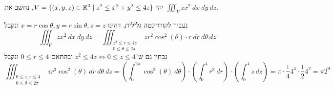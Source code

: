 \Question{}
יהי $V = \{ (x, y, z) \in \mathbb{R}^3 \mid z^2 \le x^2 + y^2 \le 4z \}$, נחשב את $\iiint_V zx^2\ dx\ dy\ dz$.

נעביר לקורדינטה גלילית, דהינו $x = r \cos \theta, y = r \sin \theta, z = z$ ונקבל
\[
	\iiint_V z x^2\ dx\ dy\ dz
	= \iiint_{\substack{z^2 \le r \le 4z \\ 0 \le \theta \le 2\pi}} z r^2 \cos^2(\theta) \cdot r\ dr\ d\theta\ dz
\]
נבחין גם ש־$z^2 \le 4z \iff 0 \le z \le 4$ ובהתאם $0 \le r \le 4$ ונקבל
\[
	\iiint_{\substack{0 \le z, r \le 4 \\ 0 \le \theta \le 2\pi}} z r^3 \cos^2(\theta)\ dr\ d\theta\ dz
	= \left( \int_0^{2\pi} \cos^2(\theta)\ d\theta \right) \cdot \left( \int_0^4 r^3\ dr \right) \cdot \left( \int_0^4 z\ dz \right)
	= \pi \cdot \frac{1}{4} 4^4 \cdot \frac{1}{2} 4^2 = \pi 2^9
\]


